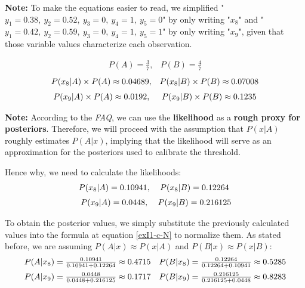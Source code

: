 \documentclass[12pt]{article}
\begin{document}
\begin{enumerate}[leftmargin=\labelsep]
\begin{enumerate}
          \textbf{Note:} To make the equations easier to read, we simplified "$y_1 = 0.38, \ y_2 = 0.52, \ y_3 = 0, \ y_4 = 1, \ y_5 = 0$" by only writing "$x_8$"
          and "$y_1 = 0.42, \ y_2 = 0.59, \ y_3 = 0, \ y_4 = 1, \ y_5 = 1$" by only writing "$x_9$", given that those variable values characterize each observation.

          \[
              \begin{array}{cc}
                  P(A) = \frac{3}{7}, &
                  P(B) = \frac{4}{7}
              \end{array}
          \]
          \[
              \begin{array}{cc}
                  P(x_8 | A) \times P(A) \approx 0.04689, &
                  P(x_8 | B) \times P(B) \approx 0.07008  \\[\medskipamount]
                  P(x_9 | A) \times P(A) \approx 0.0192,  &
                  P(x_9 | B) \times P(B) \approx 0.1235
              \end{array}
          \]

          \textbf{Note:} According to the \textit{FAQ}, we can use the \textbf{likelihood} as a \textbf{rough proxy for posteriors}.
          Therefore, we will proceed with the assumption that $P(x | A)$ roughly estimates $P(A | x)$, implying that the likelihood
          will serve as an approximation for the posteriors used to calibrate the threshold.

          Hence why, we need to calculate the likelihoods:
          $$
              \begin{array}{cc}
                  P(x_8 | A) = 0.10941, &
                  P(x_8 | B) = 0.12264  \\[\medskipamount]
                  P(x_9 | A) = 0.0448,  &
                  P(x_9 | B) = 0.216125
              \end{array}
          $$

          To obtain the posterior values, we simply substitute the previously calculated values into the formula at equation \eqref{exI1-c-N} to normalize them.
          As stated before, we are assuming $P(A | x) \approx P(x | A)$ and $P(B | x) \approx P(x | B)$:
          $$
              \begin{array}{cc}
                  P(A | x_8) = \frac{0.10941}{0.10941 + 0.12264} \approx 0.4715 &
                  P(B | x_8) = \frac{0.12264}{0.12264 + 0.10941} \approx 0.5285 \\[\medskipamount]
                  P(A | x_9) = \frac{0.0448}{0.0448 + 0.216125} \approx 0.1717  &
                  P(B | x_9) = \frac{0.216125}{0.216125 + 0.0448} \approx 0.8283
              \end{array}
          $$


\end{enumerate}
\end{enumerate}
\end{document}
